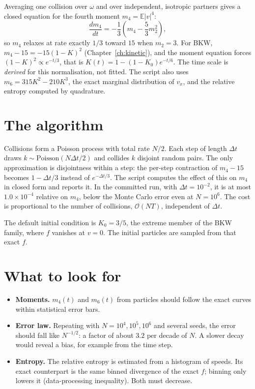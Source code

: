 \documentclass[11pt,a4paper,openany]{book}
\theoremstyle{definition}
\theoremstyle{plain}
\begin{document}
Averaging one collision over $\omega$ and over independent, isotropic partners gives a closed
equation for the fourth moment $m_4=\mathbb E|v|^4$:
\begin{equation}
  \frac{dm_4}{dt}=-\frac13\left(m_4-\frac53m_2^2\right),
\end{equation}
so $m_4$ relaxes at rate exactly $1/3$ toward $15$ when $m_2=3$. For BKW,
$m_4-15=-15(1-K)^2$ (Chapter~\ref{ch:kinetic}), and the moment equation forces
$(1-K)^2\propto e^{-t/3}$, that is $K(t)=1-(1-K_0)e^{-t/6}$. The time scale is \emph{derived}
for this normalisation, not fitted. The script also uses $m_6=315K^2-210K^3$, the exact marginal
distribution of $v_x$, and the relative entropy computed by quadrature.

\section{The algorithm}

Collisions form a Poisson process with total rate $N/2$. Each step of length $\Delta t$ draws
$k\sim\mathrm{Poisson}(N\Delta t/2)$ and collides $k$ disjoint random pairs. The only
approximation is disjointness within a step: the per-step contraction of $m_4-15$ becomes
$1-\Delta t/3$ instead of $e^{-\Delta t/3}$. The script computes the effect of this on $m_4$ in
closed form and reports it. In the committed run, with $\Delta t=10^{-2}$, it is at most
$1.0\times10^{-4}$ relative on $m_4$, below the Monte Carlo error even at $N=10^6$. The cost is proportional to the number of collisions, $\mathcal O(NT)$, independent of
$\Delta t$.

The default initial condition is $K_0=3/5$, the extreme member of the BKW family, where $f$
vanishes at $v=0$. The initial particles are sampled from that exact $f$.

\section{What to look for}

\begin{itemize}
  \item \textbf{Moments.} $m_4(t)$ and $m_6(t)$ from particles should follow the exact curves
        within statistical error bars.
  \item \textbf{Error law.} Repeating with $N=10^4,10^5,10^6$ and several seeds, the error should
        fall like $N^{-1/2}$: a factor of about $3.2$ per decade of $N$. A slower decay would
        reveal a bias, for example from the time step.
  \item \textbf{Entropy.} The relative entropy is estimated from a histogram of speeds. Its exact
        counterpart is the same binned divergence of the exact $f$; binning only lowers it
        (data-processing inequality). Both must decrease.
\end{itemize}
\end{document}
